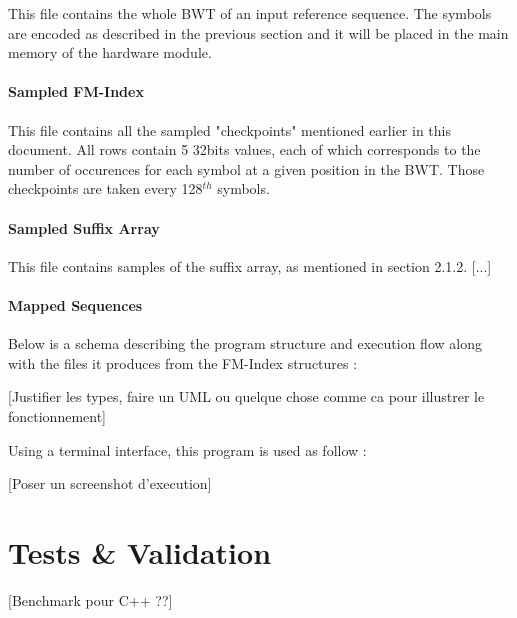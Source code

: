 This file contains the whole BWT of an input reference sequence. The symbols are encoded as described in the previous section and it will be placed in the main memory of the hardware module.

\paragraph{Sampled FM-Index}

This file contains all the sampled "checkpoints" mentioned earlier in this document. All rows contain 5 32bits values, each of which corresponds to the number of occurences for each symbol at a given position in the BWT. Those checkpoints are taken every 128$^{th}$ symbols.

\paragraph{Sampled Suffix Array}

This file contains samples of the suffix array, as mentioned in section 2.1.2.
[...]

\paragraph{Mapped Sequences}

\vspace*{4mm}
Below is a schema describing the program structure and execution flow along with the files it produces from the FM-Index structures :

[Justifier les types, faire un UML ou quelque chose comme ca pour illustrer le fonctionnement]

Using a terminal interface, this program is used as follow :

[Poser un screenshot d'execution]


\section{Tests \& Validation}

[Benchmark pour C++ ??]